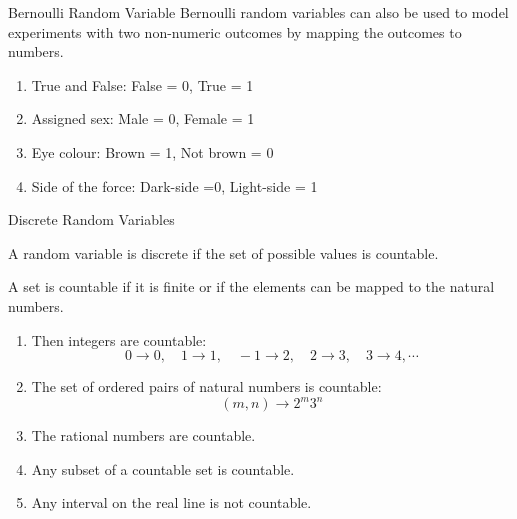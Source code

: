 \documentclass[aspectratio=169,xcolor=pdftex,dvipsnames,table]{beamer}\usepackage[]{graphicx}\usepackage[]{xcolor}
\begin{document}
\begin{frame}

  \begin{block}{Bernoulli Random Variable}
    Bernoulli random variables can also be used to model experiments with two non-numeric outcomes by mapping the outcomes to numbers. 
    
    \medskip
    
    \begin{enumerate}[1)]
    \item True and False: False = 0, True = 1
    \item Assigned sex: Male = 0, Female = 1
    \item Eye colour: Brown = 1, Not brown = 0
    \item Side of the force: Dark-side =0, Light-side = 1
    \end{enumerate}
  \end{block}
\end{frame}

\begin{frame}
  \begin{block}{Discrete Random Variables}

    A random variable is discrete if the set of possible values is countable.
    
    \medskip
    
    A set is countable if it is finite or if the elements can be mapped to the natural numbers.
    
    \begin{enumerate}[1)]
    \item Then integers are countable:
    $$
    0 \rightarrow 0, \quad 1 \rightarrow 1, \quad -1 \rightarrow 2, \quad 2 \rightarrow 3, \quad 3 \rightarrow 4, \cdots
    $$
    \item The set of ordered pairs of natural numbers is countable:
    $$
    (m,n)\rightarrow 2^m 3^n
    $$
    \item The rational numbers are countable.
    \item Any subset of a countable set is countable.
    \item Any interval on the real line is not countable. 
    \end{enumerate}
 \end{block}
\end{frame}
\end{document}
